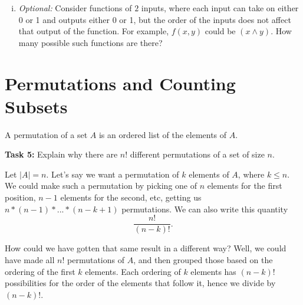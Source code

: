 \documentclass[12pt,letterpaper]{article}
\begin{document}
\begin{enumerate}[a.]
\begin{enumerate}[i.]
        \textit{Hint:} Two functions are identical if every input leads to the same output.
	    \begin{mdframed} \vspace{2cm} \end{mdframed}

	    \item \textit{Optional: }Consider functions of $2$ inputs, where each input can take on either 0 or 1 and outputs either 0 or 1, but the order of the inputs does not affect that output of the function. For example, $f(x, y)$ could be $(x \land y)$. How many possible such functions are there?
	    \begin{mdframed} \vspace{2cm} \end{mdframed}
      \end{enumerate}
  \end{enumerate} 
	
	\newpage
	
	\section*{Permutations and Counting Subsets}
	   
	A permutation of a set $A$ is an ordered list of the elements of $A$.
	
	\textbf{Task 5: }Explain why there are $n!$ different permutations of a set of size $n$.
	
	\begin{mdframed} \vspace{1cm} \end{mdframed}
	
	Let $|A| = n$. Let's say we want a permutation of $k$ elements of $A$, where $k \leq n$. We could make such a permutation by picking one of $n$ elements for the first position, $n-1$ elements for the second, etc, getting us $n*(n-1)*...*(n-k+1)$ permutations. We can also write this quantity  $$\frac{n!}{(n-k)!}.$$
	
	How could we have gotten that same result in a different way? Well, we could have made all $n!$ permutations of $A$, and then grouped those based on the ordering of the first $k$ elements. Each ordering of $k$ elements has $(n-k)!$ possibilities for the order of the elements that follow it, hence we divide by $(n-k)!$.
	
\end{document}
